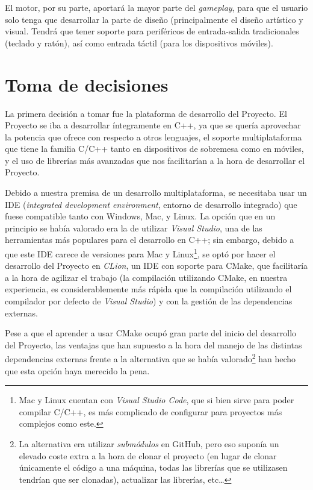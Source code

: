 \medskip

El motor, por su parte, aportará la mayor parte del \textit{gameplay}, para que el usuario solo tenga que desarrollar la parte de diseño (principalmente el diseño artístico y visual. Tendrá que tener soporte para periféricos de entrada-salida tradicionales (teclado y ratón), así como entrada táctil (para los dispositivos móviles). 

\section{Toma de decisiones}
\label{sec:decisiones}
La primera decisión a tomar fue la plataforma de desarrollo del Proyecto. El Proyecto se iba a desarrollar íntegramente en C++, ya que se quería aprovechar la potencia que ofrece con respecto a otros lenguajes, el soporte multiplataforma que tiene la familia C/C++ tanto en dispositivos de sobremesa como en móviles, y el uso de librerías más avanzadas que nos facilitarían a la hora de desarrollar el Proyecto.

\medskip

Debido a nuestra premisa de un desarrollo multiplataforma, se necesitaba usar un IDE (\textit{integrated development environment}, entorno de desarrollo integrado) que fuese compatible tanto con Windows, Mac, y Linux. La opción que en un principio se había valorado era la de utilizar \textit{Visual Studio}, una de las herramientas más populares para el desarrollo en C++; sin embargo, debido a que este IDE carece de versiones para Mac y Linux\footnote{Mac y Linux cuentan con \textit{Visual Studio Code}, que si bien sirve para poder compilar C/C++, es más complicado de configurar para proyectos más complejos como este.}, se optó por hacer el desarrollo del Proyecto en \textit{CLion}, un IDE con soporte para CMake, que facilitaría a la hora de agilizar el trabajo (la compilación utilizando CMake, en nuestra experiencia, es considerablemente más rápida que la compilación utilizando el compilador por defecto de \textit{Visual Studio}) y con la gestión de las dependencias externas.

\smallskip

Pese a que el aprender a usar CMake ocupó gran parte del inicio del desarrollo del Proyecto, las ventajas que han supuesto a la hora del manejo de las distintas dependencias externas frente a la alternativa que se había valorado\footnote{La alternativa era utilizar \textit{submódulos} en GitHub, pero eso suponía un elevado coste extra a la hora de clonar el proyecto (en lugar de clonar únicamente el código a una máquina, todas las librerías que se utilizasen tendrían que ser clonadas), actualizar las librerías, etc\ldots} han hecho que esta opción haya merecido la pena.


